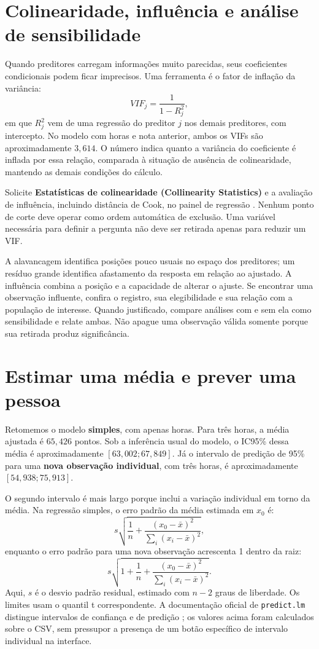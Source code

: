 \section{Colinearidade, influência e análise de sensibilidade}

Quando preditores carregam informações muito parecidas, seus coeficientes condicionais podem ficar imprecisos. Uma ferramenta é o fator de inflação da variância:
\[
VIF_j=\frac{1}{1-R_j^2},
\]
em que $R_j^2$ vem de uma regressão do preditor $j$ nos demais preditores, com intercepto. No modelo com horas e nota anterior, ambos os VIFs são aproximadamente $3{,}614$. O número indica quanto a variância do coeficiente é inflada por essa relação, comparada à situação de ausência de colinearidade, mantendo as demais condições do cálculo.

Solicite \textbf{Estatísticas de colinearidade (Collinearity Statistics)} e a avaliação de influência, incluindo distância de Cook, no painel de regressão \parencite{JamoviRegressao}. Nenhum ponto de corte deve operar como ordem automática de exclusão. Uma variável necessária para definir a pergunta não deve ser retirada apenas para reduzir um VIF.

A alavancagem identifica posições pouco usuais no espaço dos preditores; um resíduo grande identifica afastamento da resposta em relação ao ajustado. A influência combina a posição e a capacidade de alterar o ajuste. Se encontrar uma observação influente, confira o registro, sua elegibilidade e sua relação com a população de interesse. Quando justificado, compare análises com e sem ela como sensibilidade e relate ambas. Não apague uma observação válida somente porque sua retirada produz significância.

\section{Estimar uma média e prever uma pessoa}
\label{sec:intervalos-regressao}

Retomemos o modelo \textbf{simples}, com apenas horas. Para três horas, a média ajustada é $65{,}426$ pontos. Sob a inferência usual do modelo, o IC95\% dessa média é aproximadamente $[63{,}002;67{,}849]$. Já o intervalo de predição de 95\% para uma \textbf{nova observação individual}, com três horas, é aproximadamente $[54{,}938;75{,}913]$.

O segundo intervalo é mais largo porque inclui a variação individual em torno da média. Na regressão simples, o erro padrão da média estimada em $x_0$ é:
\[
s\sqrt{\frac{1}{n}+\frac{(x_0-\bar{x})^2}{\sum_i(x_i-\bar{x})^2}},
\]
enquanto o erro padrão para uma nova observação acrescenta 1 dentro da raiz:
\[
s\sqrt{1+\frac{1}{n}+\frac{(x_0-\bar{x})^2}{\sum_i(x_i-\bar{x})^2}}.
\]
Aqui, $s$ é o desvio padrão residual, estimado com $n-2$ graus de liberdade. Os limites usam o quantil t correspondente. A documentação oficial de \texttt{predict.lm} distingue intervalos de confiança e de predição \parencite{RPredicaoLinear}; os valores acima foram calculados sobre o CSV, sem pressupor a presença de um botão específico de intervalo individual na interface.

